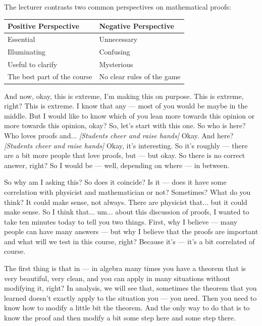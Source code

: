\begin{math-stroke}
The lecturer contrasts two common perspectives on mathematical proofs:
\begin{center}
\begin{tabular}{l | l}
\textbf{Positive Perspective} & \textbf{Negative Perspective} \\ \hline
Essential & Unnecessary \\
Illuminating & Confusing \\
Useful to clarify & Mysterious \\
The best part of the course & No clear rules of the game
\end{tabular}
\end{center}
\end{math-stroke}

\begin{spoken-clean}[00:13:50 - 00:15:00]
And now, okay, this is extreme, I'm making this on purpose. This is extreme, right? This is extreme. I know that any --- most of you would be maybe in the middle. But I would like to know which of you lean more towards this opinion or more towards this opinion, okay? So, let's start with this one. So who is here? Who loves proofs and... \textit{[Students cheer and raise hands]} Okay. And here? \textit{[Students cheer and raise hands]} Okay, it's interesting. So it's roughly --- there are a bit more people that love proofs, but --- but okay. So there is no correct answer, right? So I would be --- well, depending on where --- in between. 
 
So why am I asking this? So does it coincide? Is it --- does it have some correlation with physicist and mathematician or not? Sometimes? What do you think? It could make sense, not always. There are physicist that... but it could make sense. So I think that... um... about this discussion of proofs, I wanted to take ten minutes today to tell you two things. First, why I believe --- many people can have many answers --- but why I believe that the proofs are important and what will we test in this course, right? Because it's --- it's a bit correlated of course. 

The first thing is that in --- in algebra many times you have a theorem that is very beautiful, very clean, and you can apply in many situations without modifying it, right? In analysis, we will see that, sometimes the theorem that you learned doesn't exactly apply to the situation you --- you need. Then you need to know how to modify a little bit the theorem. And the only way to do that is to know the proof and then modify a bit some step here and some step there.
\end{spoken-clean}

